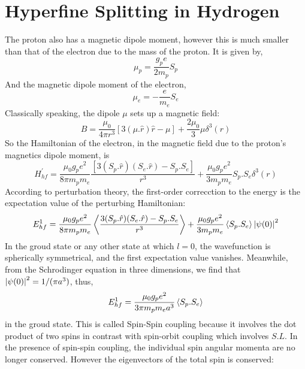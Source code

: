 \section{Hyperfine Splitting in Hydrogen}
The proton also has a magnetic dipole moment, however this is much smaller than that of the electron due to the mass of the proton. It is given by,
\begin{equation}
\mu_{p} = \frac{g_{p} e}{2 m_{p}}S_{p}
\end{equation}
And the magnetic dipole moment of the electron,
\begin{equation}
\mu_{e} = -\frac{e}{m_{e}}S_{e}
\end{equation}
Classically speaking, the dipole $\mu$ sets up a magnetic field:
\begin{equation}
B = \frac{\mu_{0}}{4 \pi r^{3}}[3(\mu . \hat{r})\hat{r} - \mu] + \frac{2 \mu_{0}}{3} \mu \delta^{3}(r)
\end{equation}
So the Hamiltonian of the electron, in the magnetic field due to the proton's magnetics dipole moment, is
\begin{equation}
H^{'}_{hf} = \frac{\mu_{0} g_{p} e^{2}}{8 \pi m_{p} m_{e}}\frac{[3(S_{p}. \hat{r})(S_{e}. \hat{r}) - S_{p}.S_{e}]}{r^{3}} + \frac{\mu_{0} g_{p} e^{2}}{3 m_{p} m_{e}}S_{p}.S_{e} \delta^{3}(r)
\end{equation}
According to perturbation theory, the first-order correcction to the energy is the expectation value of the perturbing Hamiltonian:
\begin{equation}
E^{1}_{hf} = \frac{\mu_{0} g_{p} e^{2}}{8 \pi m_{p} m_{e}} \expval{\frac{3(S_{p}.\hat{r})(S_{e}.\hat{r}) - S_{p}.S_{e}}{r^{3}}} + \frac{\mu_{0} g_{p} e^{2}}{3 m_{p} m_{e}}\expval{S_{p}.S_{e}}\abs{\psi(0)}^{2}
\end{equation}
In the groud state or any other state at which $l = 0$, the wavefunction is spherically symmetrical, and the first expectation value vanishes. Meanwhile, from the Schrodinger equation in three dimensions, we find that $\abs{\psi(0)}^{2} = 1/(\pi a^{3})$, thus,
\begin{equation}
E^{1}_{hf} = \frac{\mu_{0} g_{p} e^{2}}{3 \pi m_{p}m_{e} a^{3}}\expval{S_{p}.S_{e}}
\end{equation}
in the groud state. This is called Spin-Spin coupling because it involves the dot product of two spins in contrast with spin-orbit coupling which involves $S.L$. In the presence of spin-spin coupling, the individual spin angular momenta are no longer conserved. However the eigenvectors of the total spin is conserved:
